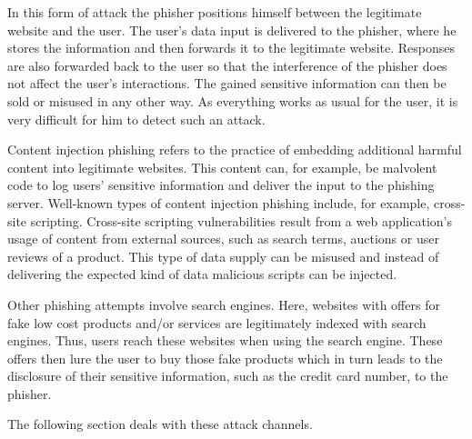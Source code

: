 \begin{description}[leftmargin=0cm]
	\item[Man-in-the-Middle Phishing] In this form of attack the phisher positions himself between the legitimate website and the user.
 The user's data input is delivered to the phisher, where he stores the information and then forwards it to the legitimate website.
 Responses are also forwarded back to the user so that the interference of the phisher does not affect the user's interactions.
 The gained sensitive information can then be sold or misused in any other way.
 As everything works as usual for the user, it is very difficult for him to detect such an attack.
 
	\item[Content Injection Phishing] Content injection phishing refers to the practice of embedding additional harmful content into legitimate websites.
 This content can, for example, be malvolent code to log users' sensitive information and deliver the input to the phishing server.
 Well-known types of content injection phishing include, for example, cross-site scripting.
 Cross-site scripting vulnerabilities result from a web application's usage of content from external sources, such as search terms, auctions or user reviews of a product.
 This type of data supply can be misused and instead of delivering the expected kind of data malicious scripts can be injected.

	\item[Search Engine Phishing] Other phishing attempts involve search engines.
 Here, websites with offers for fake low cost products and/or services are legitimately indexed with search engines.
 Thus, users reach these websites when using the search engine.
 These offers then lure the user to buy those fake products which in turn leads to the disclosure of their sensitive information, such as the credit card number, to the phisher.

\end{description}

 The following section deals with these attack channels.


